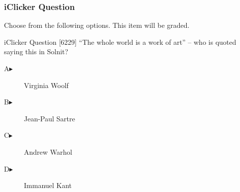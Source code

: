 \documentclass[xcolor=dvipsnames]{beamer}
\begin{document}
\begin{frame}
  \frametitle{iClicker Question}
Choose from the following options. This item will be graded.
\begin{block}{iClicker Question}
[6229] ``The whole world is a work of art'' -- who is quoted saying this in Solnit?
\end{block}
\begin{description}
\item[A\hspace{.2in}$\blacktriangleright$] Virginia Woolf
\item[B\hspace{.2in}$\blacktriangleright$] Jean-Paul Sartre
\item[C\hspace{.2in}$\blacktriangleright$] Andrew Warhol
\item[D\hspace{.2in}$\blacktriangleright$] Immanuel Kant
\end{description}
\end{frame}
\end{document}

